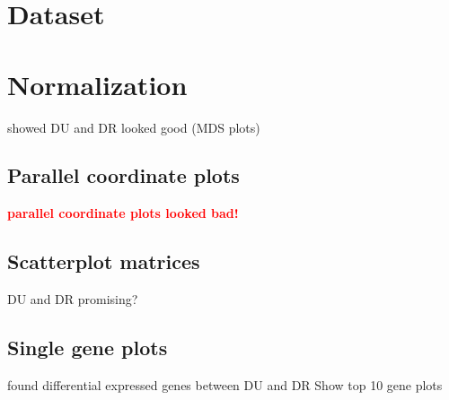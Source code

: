 \documentclass[11pt,a4paper,oldfontcommands,openany]{memoir}
\numberwithin{equation}{section} %
\begin{document}
\section{Dataset}
\section{Normalization}
showed DU and DR looked good (MDS plots)
\subsection{Parallel coordinate plots}
\textbf{\textcolor{Red}{parallel coordinate plots looked bad!}}
\subsection{Scatterplot matrices}
DU and DR promising?
\subsection{Single gene plots}
found differential expressed genes between DU and DR
Show top 10 gene plots



\end{document}
